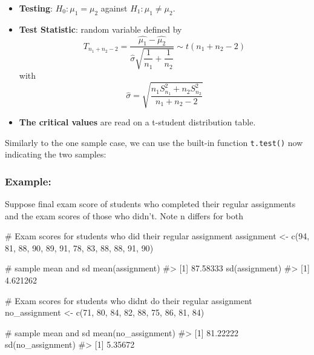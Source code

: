 \documentclass[
  letterpaper,
  DIV=11,
  numbers=noendperiod]{scrreprt}
\newenvironment{Shaded}{\begin{snugshade}}{\end{snugshade}}
\newcommand{\CommentTok}[1]{\textcolor[rgb]{0.37,0.37,0.37}{#1}}
\newcommand{\DecValTok}[1]{\textcolor[rgb]{0.68,0.00,0.00}{#1}}
\newcommand{\FunctionTok}[1]{\textcolor[rgb]{0.28,0.35,0.67}{#1}}
\newcommand{\NormalTok}[1]{\textcolor[rgb]{0.00,0.23,0.31}{#1}}
\newcommand{\OtherTok}[1]{\textcolor[rgb]{0.00,0.23,0.31}{#1}}
\providecommand{\tightlist}{%
  \setlength{\itemsep}{0pt}\setlength{\parskip}{0pt}}\usepackage{longtable,booktabs,array}
\begin{document}
\begin{itemize}
\tightlist
\item
  \textbf{Testing}: \(H_0: \mu_1 = \mu_2\) against
  \(H_1: \mu_1 \neq \mu_2\).
\item
  \textbf{Test Statistic}: random variable defined by
  \[T_{n_1 + n_2 - 2} = \dfrac{\hat{\mu_1} - \hat{\mu_2}}{\hat{\sigma} \sqrt{\dfrac{1} {n_1} + \dfrac{1} {n_2}}} \sim t(n_1 + n_2 - 2)\]
  with
  \[\hat{\sigma} = \sqrt{ \dfrac{n_1 S^2_{n_1} + n_2 S^2_{n_2}}{n_1 + n_2 - 2} }\]
\item
  \textbf{The critical values} are read on a t-student distribution
  table.
\end{itemize}

Similarly to the one sample case, we can use the built-in function
\texttt{t.test()} now indicating the two samples:

\subsubsection{Example:}\label{example-9}

Suppose final exam score of students who completed their regular
assignments and the exam scores of those who didn't. Note n differs for
both

\begin{Shaded}
\begin{Highlighting}[]
\CommentTok{\# Exam scores for students who did their regular assignment}
\NormalTok{assignment }\OtherTok{\textless{}{-}} \FunctionTok{c}\NormalTok{(}\DecValTok{94}\NormalTok{, }\DecValTok{81}\NormalTok{, }\DecValTok{88}\NormalTok{, }\DecValTok{90}\NormalTok{, }\DecValTok{89}\NormalTok{, }\DecValTok{91}\NormalTok{, }\DecValTok{78}\NormalTok{, }\DecValTok{83}\NormalTok{, }\DecValTok{88}\NormalTok{, }\DecValTok{88}\NormalTok{, }\DecValTok{91}\NormalTok{, }\DecValTok{90}\NormalTok{)}

\CommentTok{\# sample mean and sd}
\FunctionTok{mean}\NormalTok{(assignment)}
\CommentTok{\#\textgreater{} [1] 87.58333}
\FunctionTok{sd}\NormalTok{(assignment)}
\CommentTok{\#\textgreater{} [1] 4.621262}

\CommentTok{\# Exam scores for students who didn\textquotesingle{}t do their regular assignment}
\NormalTok{no\_assignment }\OtherTok{\textless{}{-}} \FunctionTok{c}\NormalTok{(}\DecValTok{71}\NormalTok{, }\DecValTok{80}\NormalTok{, }\DecValTok{84}\NormalTok{, }\DecValTok{82}\NormalTok{, }\DecValTok{88}\NormalTok{, }\DecValTok{75}\NormalTok{, }\DecValTok{86}\NormalTok{, }\DecValTok{81}\NormalTok{, }\DecValTok{84}\NormalTok{)}

\CommentTok{\# sample mean and sd}
\FunctionTok{mean}\NormalTok{(no\_assignment)}
\CommentTok{\#\textgreater{} [1] 81.22222}
\FunctionTok{sd}\NormalTok{(no\_assignment)}
\CommentTok{\#\textgreater{} [1] 5.35672}
\end{Highlighting}
\end{Shaded}
\end{document}

